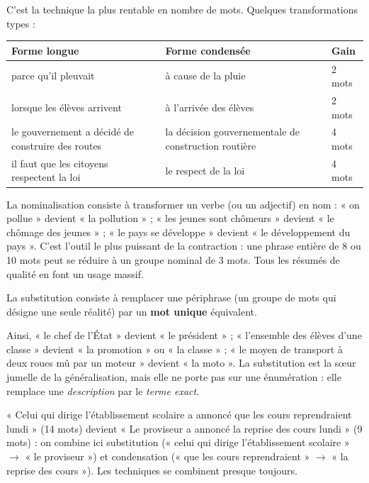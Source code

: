 \documentclass[11pt]{article}
\newcommand{\cle}[1]{{\popxbold\color{popdark}#1}}
\newcounter{popsec}
\newcounter{popsub}
\newcommand{\courssub}[1]{%
  \stepcounter{popsub}%
  \par\vspace{9pt}\noindent{\popxbold\fontsize{11.5}{13}\selectfont\color{popink}{\color{poporange}\thepopsec.\thepopsub}\hspace{6pt}#1}\par\nopagebreak\vspace{4pt}
}
\begin{document}
C'est la technique la plus rentable en nombre de mots. Quelques transformations types :

\begin{center}
\begin{tabularx}{\linewidth}{|X|X|l|}
\hline
\rowcolor{popblueL} \textbf{Forme longue} & \textbf{Forme condensée} & \textbf{Gain} \\
\hline
parce qu'il pleuvait & à cause de la pluie & 2 mots \\
\hline
lorsque les élèves arrivent & à l'arrivée des élèves & 2 mots \\
\hline
le gouvernement a décidé de construire des routes & la décision gouvernementale de construction routière & 4 mots \\
\hline
il faut que les citoyens respectent la loi & le respect de la loi & 4 mots \\
\hline
\end{tabularx}
\end{center}

\begin{savaistu}
La \cle{nominalisation} consiste à transformer un verbe (ou un adjectif) en nom : « on pollue » devient « la pollution » ; « les jeunes sont chômeurs » devient « le chômage des jeunes » ; « le pays se développe » devient « le développement du pays ». C'est l'outil le plus puissant de la contraction : une phrase entière de 8 ou 10 mots peut se réduire à un groupe nominal de 3 mots. Tous les résumés de qualité en font un usage massif.
\end{savaistu}

\courssub{Technique 4 : la substitution}

\begin{definition}[Substitution]
La \cle{substitution} consiste à remplacer une périphrase (un groupe de mots qui désigne une seule réalité) par un \textbf{mot unique} équivalent.
\end{definition}

Ainsi, « le chef de l'État » devient « le président » ; « l'ensemble des élèves d'une classe » devient « la promotion » ou « la classe » ; « le moyen de transport à deux roues mû par un moteur » devient « la moto ». La substitution est la sœur jumelle de la généralisation, mais elle ne porte pas sur une énumération : elle remplace une \emph{description} par le \emph{terme exact}.

\begin{exemplebox}
« Celui qui dirige l'établissement scolaire a annoncé que les cours reprendraient lundi » (14 mots) devient « Le proviseur a annoncé la reprise des cours lundi » (9 mots) : on combine ici substitution (« celui qui dirige l'établissement scolaire » $\rightarrow$ « le proviseur ») et condensation (« que les cours reprendraient » $\rightarrow$ « la reprise des cours »). Les techniques se combinent presque toujours.
\end{exemplebox}
\end{document}
